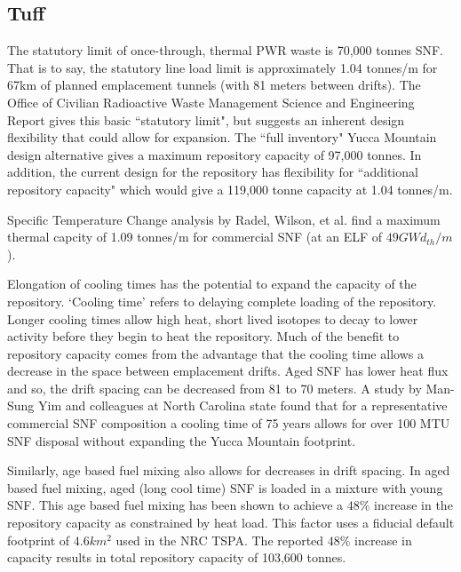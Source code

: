 \subsection{Tuff}




The statutory limit of once-through, thermal PWR waste is 70,000 
tonnes SNF. That is to say, the statutory line load limit is 
approximately 1.04 tonnes/m for 67km of planned emplacement tunnels 
(with 81 meters between drifts). The Office of Civilian Radioactive 
Waste Management Science and Engineering Report gives this basic 
``statutory limit", but suggests an inherent design flexibility that 
could allow for expansion. The ``full inventory" Yucca Mountain design 
alternative gives a maximum repository capacity of 97,000 tonnes. In 
addition, the current design for the repository has flexibility for 
``additional repository capacity" which would give a 119,000 tonne 
capacity at 1.04 tonnes/m.\cite{ doe_yucca_2002}

Specific Temperature Change analysis by Radel, Wilson, et al. find a 
maximum thermal capcity of 1.09 tonnes/m for commercial SNF (at an ELF 
of $49 GWd_{th}/m$).\cite{radel_effect_2007} 

Elongation of cooling times has the potential to expand the capacity 
of the repository. `Cooling time' refers to delaying complete loading 
of the repository. Longer cooling times allow high heat, short lived 
isotopes to decay to lower activity before they begin to heat the 
repository. Much of the benefit to repository capacity comes from the 
advantage that the cooling time allows a decrease in the space between 
emplacement drifts. Aged SNF has lower heat flux and so, the drift 
spacing can be decreased from 81 to 70 meters. A study by Man-Sung Yim 
and colleagues at North Carolina state found that for a representative 
commercial SNF composition a cooling time of 75 years allows for over 
100 MTU SNF disposal without expanding the Yucca Mountain 
footprint.\cite{li_examining_2007}

Similarly, age based fuel mixing also allows for decreases in drift 
spacing. In aged based fuel mixing, aged (long cool time) SNF is 
loaded in a mixture with young SNF. This age based fuel mixing has 
been shown to achieve a $48\%$ increase in the repository capacity as 
constrained by heat load.\cite{nicholson_thermal_2007} This factor 
uses a fiducial default footprint of $4.6 km^2$ used in the NRC TSPA.  
The reported $48\%$ increase in capacity results in total repository 
capacity of 103,600 tonnes.\cite{williams_contract_2001}

